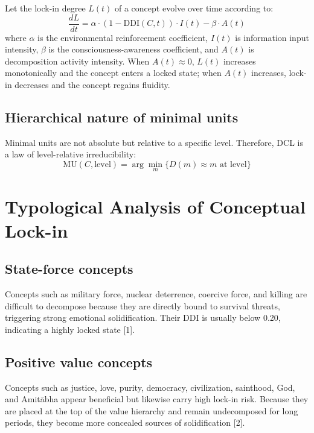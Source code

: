 \documentclass[11pt,a4paper]{article}
\begin{document}
Let the lock-in degree $L(t)$ of a concept evolve over time according to:
\begin{equation}
    \frac{dL}{dt} = \alpha \cdot (1 - \text{DDI}(C,t)) \cdot I(t) - \beta \cdot A(t)
    \label{eq:lockin}
\end{equation}
where $\alpha$ is the environmental reinforcement coefficient, $I(t)$ is information input intensity, $\beta$ is the consciousness-awareness coefficient, and $A(t)$ is decomposition activity intensity. When $A(t) \approx 0$, $L(t)$ increases monotonically and the concept enters a locked state; when $A(t)$ increases, lock-in decreases and the concept regains fluidity.

\subsection{Hierarchical nature of minimal units}

Minimal units are not absolute but relative to a specific level. Therefore, DCL is a law of level-relative irreducibility:
\begin{equation}
    \text{MU}(C, \text{level}) = \arg\min_{m} \{D(m) \approx m \text{ at level}\}
    \label{eq:mu}
\end{equation}

\section{Typological Analysis of Conceptual Lock-in}

\subsection{State-force concepts}

Concepts such as military force, nuclear deterrence, coercive force, and killing are difficult to decompose because they are directly bound to survival threats, triggering strong emotional solidification. Their DDI is usually below 0.20, indicating a highly locked state [1].

\subsection{Positive value concepts}

Concepts such as justice, love, purity, democracy, civilization, sainthood, God, and Amit\={a}bha appear beneficial but likewise carry high lock-in risk. Because they are placed at the top of the value hierarchy and remain undecomposed for long periods, they become more concealed sources of solidification [2].
\end{document}
